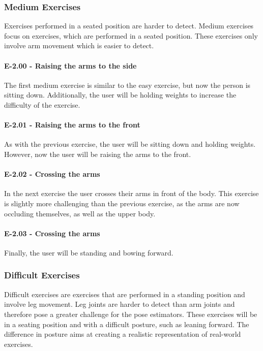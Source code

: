 \subsubsection{Medium Exercises}

Exercises performed in a seated position are harder to detect. Medium exercises focus on exercises, which are performed in a seated position. These exercises only involve arm movement which is easier to detect.

\paragraph{E-2.00 - Raising the arms to the side}

The first medium exercise is similar to the easy exercise, but now the person is sitting down. Additionally, the user will be holding weights to increase the difficulty of the exercise.

\paragraph{E-2.01 - Raising the arms to the front}

As with the previous exercise, the user will be sitting down and holding weights. However, now the user will be raising the arms to the front. 

\paragraph{E-2.02 - Crossing the arms}

 In the next exercise the user crosses their arms in front of the body. This exercise is slightly more challenging than the previous exercise, as the arms are now occluding themselves, as well as the upper body.

\paragraph{E-2.03 - Crossing the arms}

Finally, the user will be standing and bowing forward. 

\subsubsection{Difficult Exercises}

Difficult exercises are exercises that are performed in a standing position and involve leg movement. Leg joints are harder to detect than arm joints and therefore pose a greater challenge for the pose estimators. These exercises will be in a seating position and with a difficult posture, such as leaning forward. The difference in posture aims at creating a realistic representation of real-world exercises.

